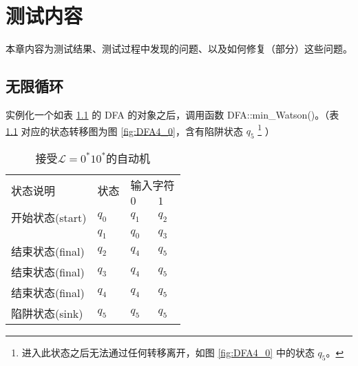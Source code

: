 \chapter{测试内容}

本章内容为测试结果、测试过程中发现的问题、以及如何修复（部分）这些问题。




\section{无限循环}\label{sec:ohloop}

实例化一个如表 \ref{tab:DFA4} 的 DFA 的对象之后，调用函数 DFA::min\_Watson()。（表 \ref{tab:DFA4} 对应的状态转移图为图 \ref{fig:DFA4_0}，含有陷阱状态 $q_5$ \footnote{进入此状态之后无法通过任何转移离开，如图 \ref{fig:DFA4_0} 中的状态 {$q_5$}。} ）

\begin{table}[!htbp]
    \caption{接受{$\mathcal{L}=0^*10^*$}的自动机{\cite{book1}}}
    \label{tab:DFA4}
    \centering
    \small%
    \setlength{\tabcolsep}{4pt}%
    \renewcommand{\arraystretch}{1.2}%
        \begin{tabular}{l p{3em}<{\centering} p{3em}<{\centering} p{3em}<{\centering}}
        \toprule %
        \multirow{2}{*}{状态说明} & \multirow{2}{*}{状态} & \multicolumn{2}{c}{输入字符} \\
		\cline{3-4}      &    &$0$ & $1$  \\
        \midrule%
        开始状态(start)  & $q_0$ & $q_1$   & $q_2$   \\
                        & $q_1$ & $q_0$   & $q_3$   \\
        结束状态(final) & $q_2$ & $q_4$   & $q_5$   \\
        结束状态(final) & $q_3$ & $q_4$   & $q_5$   \\
        结束状态(final) & $q_4$ & $q_4$   & $q_5$   \\
        陷阱状态(sink) & $q_5$ & $q_5$   & $q_5$   \\
        \bottomrule%
    \end{tabular}
\end{table}

